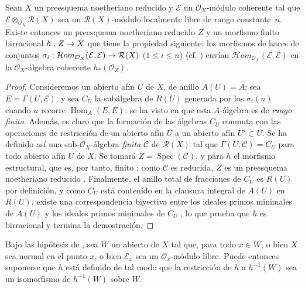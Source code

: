 \documentclass[oneside,10pt]{amsart}
\makeatletter
\renewcommand{\leq}{\leqslant}
\newcommand{\ega@arrow}[2]{\mathchoice{#1}{#2}{#2}{#2}}
\renewcommand{\to}{\ega@arrow{\longrightarrow}{\rightarrow}}
\newcommand{\oldpage}[2][]{\marginnote{\normalfont\footnotesize\textbf{#1}~|~#2}\ignorespaces}
\let\EGAOriginalLabel\label
\renewcommand{\label}[1]{\phantomsection\EGAOriginalLabel{#1}}
\makeatother
\begin{document}
\begin{lemma}[6.6.6]
\label{II.6.6.6-fr}
Sean $X$ un preesquema noetheriano reducido y $\mathcal{E}$ un $\mathcal{O}_X$-módulo coherente tal que $\mathcal{E}\otimes_{\mathcal{O}_X}\mathcal{R}(X)$ sea un $\mathcal{R}(X)$-módulo localmente libre de rango constante~$n$.
Existe entonces un preesquema noetheriano reducido $Z$ y un morfismo finito birracional $h:Z\to X$ que tiene la propiedad siguiente: los morfismos de haces de conjuntos
$\sigma_i:\mathcal{H}om_{\mathcal{O}_X}(\mathcal{E},\mathcal{E})
\to\mathcal{R}(X)$ \textup{($1\leq i\leq n$)}
\textup{(cf. )} envían $\mathcal{H}om_{\mathcal{O}_X}(\mathcal{E},\mathcal{E})$ en la $\mathcal{O}_X$-álgebra coherente $h_*(\mathcal{O}_Z)$.
\end{lemma}

\begin{proof}
Consideremos un abierto afín $U$ de $X$, de anillo $A(U)=A$;
sea $E=\Gamma(U,\mathcal{E})$, y sea $C_U$ la subálgebra de $R(U)$ generada por los $\sigma_i(u)$ cuando $u$ recorre $\operatorname{Hom}_A(E,E)$;
se ha visto en  que esta $A$-álgebra es de \emph{rango finito}.
Además, es claro que la formación de las álgebras $C_U$ conmuta con las operaciones de restricción de un abierto afín $U$ a un abierto afín $U'\subset U$.
Se ha definido así una sub-$\mathcal{O}_X$-álgebra \emph{finita} $\mathcal{C}$ de $\mathcal{R}(X)$ tal que $\Gamma(U,\mathcal{C})=C_U$ para todo abierto afín $U$ de $X$.
\oldpage[II]{133}
Se tomará $Z=\operatorname{Spec}(\mathcal{C})$, y para $h$ el morfismo estructural, que es, por tanto, finito ;
como $\mathcal{C}$ es reducida, $Z$ es un preesquema noetheriano reducido .
Finalmente, el anillo total de fracciones de $C_U$ es $R(U)$ por definición, y como $C_U$ está contenido en la clausura integral de $A(U)$ en $R(U)$, existe una correspondencia biyectiva entre los ideales primos minimales de $A(U)$ y los ideales primos minimales de $C_U$ \cite[t.~I, p.~259]{I-13}, lo que prueba que $h$ es birracional y termina la demostración.
\end{proof}

\begin{corollary}[6.6.7]
\label{II.6.6.7-fr}
Bajo las hipótesis de , sea $W$ un abierto de $X$ tal que, para todo $x\in W$, o bien $X$ sea normal en el punto $x$, o bien $\mathcal{E}_x$ sea un $\mathcal{O}_x$-módulo libre.
Puede entonces suponerse que $h$ está definido de tal modo que la restricción de $h$ a $h^{-1}(W)$ sea un isomorfismo de $h^{-1}(W)$ sobre $W$.
\end{corollary}
\end{document}
